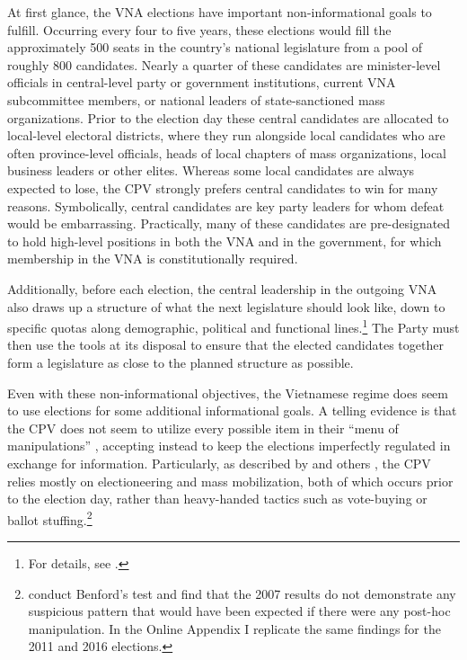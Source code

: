 \documentclass[12pt]{article}
\newcommand{\1}{\mathbbm{1}}
\begin{document}
At first glance, the VNA elections have important non-informational goals to fulfill. Occurring every four to five years, these elections would fill the approximately 500 seats in the country's national legislature from a pool of roughly 800 candidates. Nearly a quarter of these candidates are minister-level officials in central-level party or government institutions, current VNA subcommittee members, or national leaders of state-sanctioned mass organizations. Prior to the election day these central candidates are allocated to local-level electoral districts, where they run alongside local candidates who are often province-level officials, heads of local chapters of mass organizations, local business leaders or other elites. Whereas some local candidates are always expected to lose, the CPV strongly prefers central candidates to win for many reasons. Symbolically, central candidates are key party leaders for whom defeat would be embarrassing. Practically, many of these candidates are pre-designated to hold high-level positions in both the VNA and in the government, for which membership in the VNA is constitutionally required.

Additionally, before each election, the central leadership in the outgoing VNA also draws up a structure of what the next legislature should look like, down to specific quotas along demographic, political and functional lines.\footnote{For details, see \citet{MaleskySchuler2009}.} The Party must then use the tools at its disposal to ensure that the elected candidates together form a legislature as close to the planned structure as possible.

Even with these non-informational objectives, the Vietnamese regime does seem to use elections for some additional informational goals. A telling evidence is that the CPV does not seem to utilize every possible item in their ``menu of manipulations'' \citep[to quote][]{Schedler2002menu}, accepting instead to keep the elections imperfectly regulated in exchange for information. Particularly, as described by \citet{MaleskySchuler2011} and others \citep[e.g][]{Gainsborough2005}, the CPV relies mostly on electioneering and mass mobilization, both of which occurs prior to the election day, rather than heavy-handed tactics such as vote-buying or ballot stuffing.\footnote{\citet{MaleskySchuler2011} conduct Benford's test and find that the 2007 results do not demonstrate any suspicious pattern that would have been expected if there were any post-hoc manipulation. In the Online Appendix I replicate the same findings for the 2011 and 2016 elections.}
\end{document}
